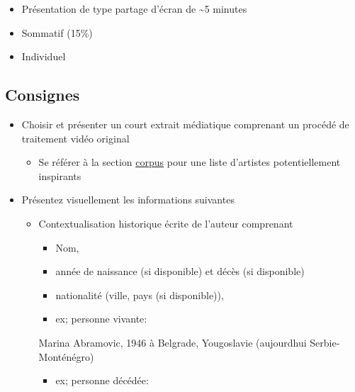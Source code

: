 \documentclass[
  french,
]{book}
\newenvironment{Shaded}{\begin{snugshade}}{\end{snugshade}}
\newcommand{\NormalTok}[1]{#1}
\providecommand{\tightlist}{%
  \setlength{\itemsep}{0pt}\setlength{\parskip}{0pt}}
\begin{document}
\begin{itemize}
\tightlist
\item
  Présentation de type partage d'écran de \textasciitilde5 minutes
\item
  Sommatif (15\%)
\item
  Individuel
\end{itemize}

\hypertarget{consignes}{%
\subsection{Consignes}\label{consignes}}

\begin{itemize}
\tightlist
\item
  Choisir et présenter un court extrait médiatique comprenant un procédé de traitement vidéo original

  \begin{itemize}
  \tightlist
  \item
    Se référer à la section \protect\hyperlink{corpus}{corpus} pour une liste d'artistes potentiellement inspirants
  \end{itemize}
\item
  Présentez visuellement les informations suivantes

  \begin{itemize}
  \tightlist
  \item
    Contextualisation historique écrite de l'auteur comprenant

    \begin{itemize}
    \tightlist
    \item
      Nom,
    \item
      année de naissance (si disponible) et décès (si disponible)
    \item
      nationalité (ville, pays (si disponible)),
    \item
      ex; personne vivante:
    \end{itemize}

\begin{Shaded}
\begin{Highlighting}[]
\NormalTok{Marina Abramovic, 1946 à Belgrade, Yougoslavie (aujourd\textquotesingle{}hui Serbie{-}Monténégro)}
\end{Highlighting}
\end{Shaded}

    \begin{itemize}
    \tightlist
    \item
      ex; personne décédée:
    \end{itemize}


\end{itemize}
\end{itemize}
\end{document}
